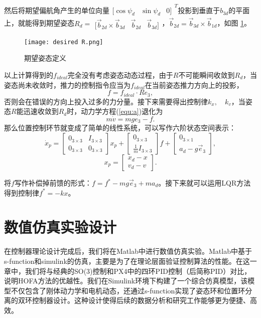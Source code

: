     然后将期望偏航角产生的单位向量$\begin{matrix} [\cos{\psi_d} & \sin{\psi_d} & 0]  \end{matrix}^T$投影到垂直于$b_{3d}$的平面上，就能得到期望姿态$R_d= \begin{matrix} [ \vec b_{2d}\times \vec b_{3d} &\vec b_{2d} & \vec b_{3d}] \end{matrix}$，$\vec b_{2d}=\vec b_{3d} \times \vec b_{1d}$，如图 \ref{fig:2}。
    \begin{figure}[!h]
        \centering
        \texttt{[image: desired R.png]}
        \caption{期望姿态定义}
        \label{fig:2}
      \end{figure}

      以上计算得到的$f_{ideal}$完全没有考虑姿态动态过程，由于$R$不可能瞬间收敛到$R_d$，当姿态尚未收敛时，推力的控制指令应当为$f_{ideal}$在当前姿态推力方向上的投影，
      $$f=f_{ideal}\cdot R e_3,$$否则会在错误的方向上投入过多的力分量。接下来需要得出控制律$k_x ,\quad k_v$，当姿态$R$能迅速收敛到$R_d$时，动力学方程(\ref{equ:a})退化为
      $$m \dot v=mge_3-f.$$
      那么位置控制环节就变成了简单的线性系统，可以写作六阶状态空间表示：
      $$\dot x_p=\begin{bmatrix}
        0_{3\times 3} & I_{3\times 3} \\
        0_{3\times 3} & 0_{3\times 3}
    \end{bmatrix} x_p+\begin{bmatrix}
        0_{3\times 3} \\ \frac{1}{m} I_{3\times 3}
    \end{bmatrix} f +\begin{bmatrix}
        0_{3 \times 1} \\ a_d-g \vec e_3 
    \end{bmatrix},$$
    $$x_p=\begin{bmatrix}
        x_d -x \\ v_d -v
    \end{bmatrix}.$$

将$f$写作补偿掉前馈的形式：$f=f^*-mg \vec e_3 +m a_d$。接下来就可以运用LQR方法得到控制律$f^*=-kx$。

\section{数值仿真实验设计}
在控制器理论设计完成后，我们将在Matlab中进行数值仿真实验。Matlab中基于s-function和simulink的仿真，主要是为了在理论层面验证控制算法的性能。在这一章中，我们将与经典的SO(3)控制和PX4中的四环PID控制（后简称PID）对比，说明HOFA方法的优越性。我们在Simulink环境下构建了一个综合仿真模型，该模型不仅包含了刚体动力学和电机动态，还通过s-function实现了姿态环和位置环分离的双环控制器设计。这种设计使得后续的数据分析和研究工作能够更为便捷、高效。

